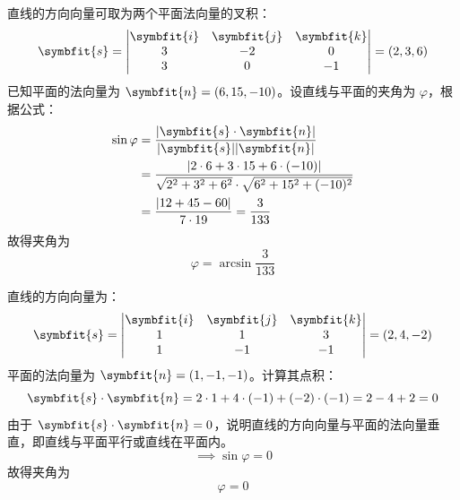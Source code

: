 \begin{solution}

    直线的方向向量可取为两个平面法向量的叉积：
    \begin{equation*}
        \symbfit{s} = \begin{vmatrix} \symbfit{i} & \symbfit{j} & \symbfit{k} \\ 3 & -2 & 0 \\ 3 & 0 & -1 \end{vmatrix} = (2, 3, 6)
    \end{equation*}
    已知平面的法向量为 $\symbfit{n} = (6, 15, -10)$。设直线与平面的夹角为 $\varphi$，根据公式：
    \begin{equation*}
        \begin{aligned}
            \sin \varphi & = \frac{|\symbfit{s} \cdot \symbfit{n}|}{|\symbfit{s}| |\symbfit{n}|}                                       \\
                         & = \frac{|2 \cdot 6 + 3 \cdot 15 + 6 \cdot (-10)|}{\sqrt{2^2 + 3^2 + 6^2} \cdot \sqrt{6^2 + 15^2 + (-10)^2}} \\
                         & = \frac{|12 + 45 - 60|}{7 \cdot 19} = \frac{3}{133}
        \end{aligned}
    \end{equation*}
    故得夹角为
    \begin{equation*}
        \boxed{\varphi = \arcsin \frac{3}{133}}
    \end{equation*}


    直线的方向向量为：
    \begin{equation*}
        \symbfit{s} = \begin{vmatrix} \symbfit{i} & \symbfit{j} & \symbfit{k} \\ 1 & 1 & 3 \\ 1 & -1 & -1 \end{vmatrix} = (2, 4, -2)
    \end{equation*}
    平面的法向量为 $\symbfit{n} = (1, -1, -1)$。计算其点积：
    \begin{equation*}
        \symbfit{s} \cdot \symbfit{n} = 2 \cdot 1 + 4 \cdot (-1) + (-2) \cdot (-1) = 2 - 4 + 2 = 0
    \end{equation*}
    由于 $\symbfit{s} \cdot \symbfit{n} = 0$，说明直线的方向向量与平面的法向量垂直，即直线与平面平行或直线在平面内。
    \begin{equation*}
        \implies \sin \varphi = 0
    \end{equation*}
    故得夹角为
    \begin{equation*}
        \boxed{\varphi = 0}
    \end{equation*}
\end{solution}


